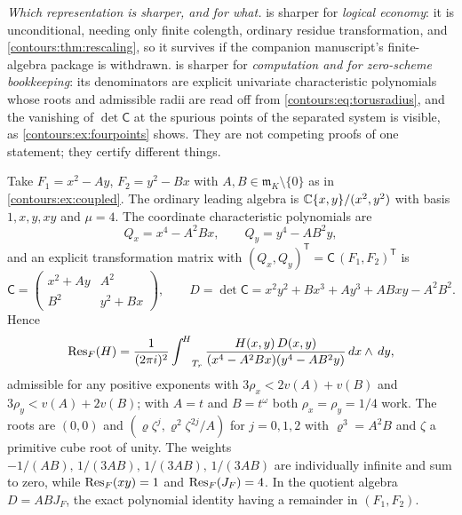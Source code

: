 \documentclass[11pt,letterpaper]{article}
\theoremstyle{definition}
\theoremstyle{remark}
\newcommand{\m}{\mathfrak m}\newcommand{\st}{\operatorname{st}}
\newcommand{\HInt}{\mathop{\int^{\!H}}\nolimits}
\numberwithin{equation}{section}
\begin{document}
\emph{Which representation is sharper, and for what.}
 is sharper for \emph{logical economy}: it
is unconditional, needing only finite colength, ordinary residue transformation, and
\cref{contours:thm:rescaling}, so it survives if the companion manuscript's
finite-algebra package is withdrawn.  is sharper for
\emph{computation and for zero-scheme bookkeeping}: its denominators are explicit
univariate characteristic polynomials whose roots and admissible radii are read off
from \eqref{contours:eq:torusradius}, and the vanishing of $\det\mathsf C$ at the
spurious points of the separated system is visible, as
\cref{contours:ex:fourpoints} shows. They are not competing proofs of one statement;
they certify different things.

\begin{example}
\label{contours:ex:fourpoints}
Take $F_1=x^2-Ay$, $F_2=y^2-Bx$ with $A,B\in\m_K\setminus\{0\}$ as in
\cref{contours:ex:coupled}. The ordinary leading algebra is $\mathbb C\{x,y\}/(x^2,y^2)$
with basis $1,x,y,xy$ and $\mu=4$. The coordinate characteristic polynomials are
\[
  Q_x=x^4-A^2Bx,\qquad Q_y=y^4-AB^2y ,
\]
and an explicit transformation matrix with
$(Q_x,Q_y)^{\mathsf T}=\mathsf C\,(F_1,F_2)^{\mathsf T}$ is
\begin{equation}\label{contours:eq:exampleC}
  \mathsf C=\begin{pmatrix}x^2+Ay&A^2\\ B^2&y^2+Bx\end{pmatrix},
  \qquad
  D=\det\mathsf C=x^2y^2+Bx^3+Ay^3+ABxy-A^2B^2 .
\end{equation}
Hence
\begin{equation}\label{contours:eq:exampletorus}
  \Res_F(H)=\frac1{(2\pi i)^2}\HInt_{T_r}
  \frac{H(x,y)\,D(x,y)}{(x^4-A^2Bx)(y^4-AB^2y)}\dd x\wedge \dd y ,
\end{equation}
admissible for any positive exponents with $3\rho_x<2v(A)+v(B)$ and
$3\rho_y<v(A)+2v(B)$; with $A=t$ and $B=t^\omega$ both $\rho_x=\rho_y=1/4$ work. The
roots are $(0,0)$ and $(\varrho\zeta^j,\varrho^2\zeta^{2j}/A)$ for $j=0,1,2$ with
$\varrho^3=A^2B$ and $\zeta$ a primitive cube root of unity. The weights
$-1/(AB),\,1/(3AB),\,1/(3AB),\,1/(3AB)$ are individually infinite and sum to zero,
while $\operatorname{Res}_F(xy)=1$ and $\operatorname{Res}_F(J_F)=4$. In the quotient algebra $D=ABJ_F$, the
exact polynomial identity having a remainder in $(F_1,F_2)$.


\end{example}
\end{document}
